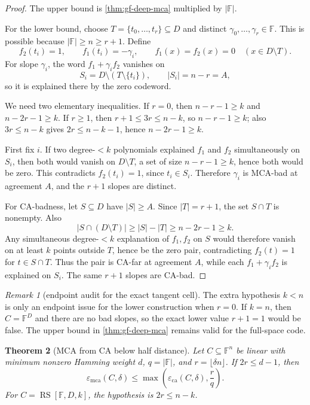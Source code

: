 \documentclass[a4paper,11pt]{amsart}
\newtheorem{theorem}{Theorem}[section]
\theoremstyle{remark}
\newtheorem{remark}[theorem]{Remark}
\newcommand{\F}{\mathbb F}
\newcommand{\RS}{\operatorname{RS}}
\newcommand{\emca}{\varepsilon_{\mathrm{mca}}}
\newcommand{\eca}{\varepsilon_{\mathrm{ca}}}
\begin{document}
\begin{proof}
The upper bound is \cref{thm:gf-deep-mca} multiplied by \(|\F|\).

For the lower bound, choose \(T=\{t_0,\ldots,t_r\}\subseteq D\) and distinct \(\gamma_0,\ldots,\gamma_r\in\F\).  This is possible because \(|\F|\ge n\ge r+1\).  Define
\[
        f_2(t_i)=1,\qquad f_1(t_i)=-\gamma_i,
        \qquad
        f_1(x)=f_2(x)=0\quad(x\in D\setminus T).
\]
For slope \(\gamma_i\), the word \(f_1+\gamma_i f_2\) vanishes on
\[
        S_i=D\setminus(T\setminus\{t_i\}),
        \qquad |S_i|=n-r=A,
\]
so it is explained there by the zero codeword.

We need two elementary inequalities.  If \(r=0\), then \(n-r-1\ge k\) and \(n-2r-1\ge k\).  If \(r\ge1\), then \(r+1\le3r\le n-k\), so \(n-r-1\ge k\); also \(3r\le n-k\) gives \(2r\le n-k-1\), hence \(n-2r-1\ge k\).

First fix \(i\).  If two degree-\(<k\) polynomials explained \(f_1\) and \(f_2\) simultaneously on \(S_i\), then both would vanish on \(D\setminus T\), a set of size \(n-r-1\ge k\), hence both would be zero.  This contradicts \(f_2(t_i)=1\), since \(t_i\in S_i\).  Therefore \(\gamma_i\) is MCA-bad at agreement \(A\), and the \(r+1\) slopes are distinct.

For CA-badness, let \(S\subseteq D\) have \(|S|\ge A\).  Since \(|T|=r+1\), the set \(S\cap T\) is nonempty.  Also
\[
        |S\cap(D\setminus T)|\ge |S|-|T|\ge n-2r-1\ge k .
\]
Any simultaneous degree-\(<k\) explanation of \(f_1,f_2\) on \(S\) would therefore vanish on at least \(k\) points outside \(T\), hence be the zero pair, contradicting \(f_2(t)=1\) for \(t\in S\cap T\).  Thus the pair is CA-far at agreement \(A\), while each \(f_1+\gamma_i f_2\) is explained on \(S_i\).  The same \(r+1\) slopes are CA-bad.
\end{proof}

\begin{remark}[endpoint audit for the exact tangent cell]\label{rem:tangent-endpoint-audit}
The extra hypothesis \(k<n\) is only an endpoint issue for the lower construction when \(r=0\).  If \(k=n\), then \(C=\F^D\) and there are no bad slopes, so the exact lower value \(r+1=1\) would be false.  The upper bound in \cref{thm:gf-deep-mca} remains valid for the full-space code.
\end{remark}

\begin{theorem}[MCA from CA below half distance]\label{thm:gf-mca-from-ca}
Let \(C\subseteq\F^n\) be linear with minimum nonzero Hamming weight \(d\), \(q=|\F|\), and \(r=\lfloor\delta n\rfloor\).  If \(2r\le d-1\), then
\[
        \emca(C,\delta)\le \max\!\left(\eca(C,\delta),\frac{r}{q}\right).
\]
For \(C=\RS[\F,D,k]\), the hypothesis is \(2r\le n-k\).
\end{theorem}
\end{document}

